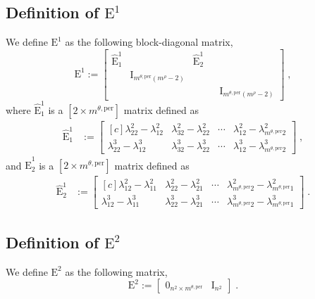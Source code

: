\documentclass[10pt]{article}
\newcommand{\mbf}[1]{{\boldsymbol{#1}}}
\newcommand{\mat}[1]{\mbf{\mathrm{#1}}}
\newcommand{\cU}{\theta}
\newcommand{\cV}{\rho}
\newcommand{\ndofV}{m^\cV}
\newcommand{\per}{\mathrm{per}}
\newcommand{\pndofU}{m^{\cU,\per}}
\newcommand{\bary}{\lambda}
\theoremstyle{plain}
\theoremstyle{definition}
\theoremstyle{remark}
\begin{document}
\subsection{Definition of $\mat{E}^1$}
We define $\mat{E}^1$ as the following block-diagonal matrix,
\begin{equation}\label{eq:polar-ext-1}
    \mat{E}^1 := 
    \begin{bmatrix}
    \widehat{\mat{E}}^1_1 & & \widehat{\mat{E}}^1_2 & \\
    & \mat{I}_{\pndofU(\ndofV-2)} & & &\\
    &  & & & \mat{I}_{\pndofU(\ndofV-2)}
    \end{bmatrix}\;,
\end{equation}
where $\widehat{\mat{E}}^1_1$ is a $[2 \times \pndofU]$ matrix defined as
\begin{equation}\label{eq:polar-ext-1-core-1}
    \begin{split}
    \widehat{\mat{E}}^1_1 &:= 
    \begin{bmatrix*}[c]
        \bary^{2}_{22}-\bary^{2}_{12} & \bary^{2}_{32}-\bary^{2}_{22} &\cdots &  \bary^{2}_{12}-\bary^{2}_{\pndofU 2}\\
        \bary^{3}_{22}-\bary^{3}_{12} & \bary^{3}_{32}-\bary^{3}_{22} &\cdots & \bary^{3}_{12}-\bary^{3}_{\pndofU 2}
    \end{bmatrix*}\;,
\end{split}
\end{equation}
and $\widehat{\mat{E}}^1_2$ is a $[2 \times \pndofU]$ matrix defined as
\begin{equation}\label{eq:polar-ext-1-core-2}
    \begin{split}
        \widehat{\mat{E}}^1_2 &:= 
        \begin{bmatrix*}[c]
            \bary^{2}_{12}-\bary^{2}_{11} & \bary^{2}_{22}-\bary^{2}_{21} & \cdots & \bary^{2}_{\pndofU 2}-\bary^{2}_{\pndofU 1}\\
            \bary^{3}_{12}-\bary^{3}_{11} & \bary^{3}_{22}-\bary^{3}_{21} & \cdots & \bary^{3}_{\pndofU 2}-\bary^{3}_{\pndofU 1}
        \end{bmatrix*}\;.
\end{split}
\end{equation}

\subsection{Definition of $\mat{E}^2$}
We define $\mat{E}^2$ as the following matrix,
\begin{equation}\label{eq:polar-ext-2}
    \mat{E}^2 := 
    \begin{bmatrix}
        \mat{0}_{n^2 \times \pndofU} & \mat{I}_{n^2}
    \end{bmatrix}\;.
\end{equation}
\end{document}
